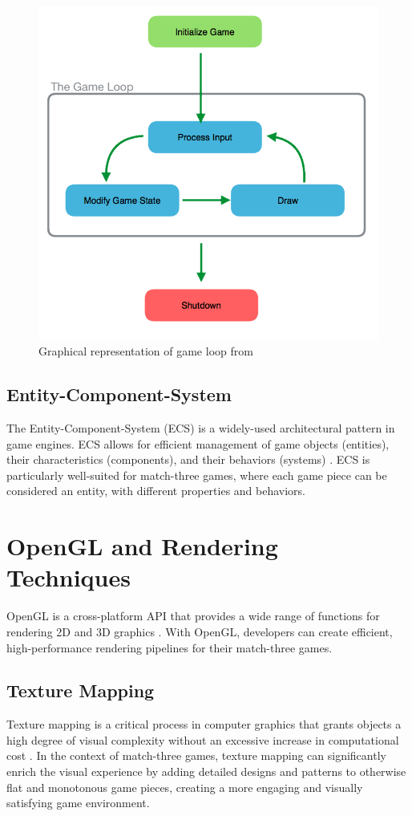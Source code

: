 \documentclass[runningheads, 12pt]{llncs}
\begin{document}
\begin{figure}
\includegraphics[width=\textwidth]{gameloop.png}
\caption{Graphical representation of game loop from \cite{ref_url3}} \label{fig1}
\end{figure}

\subsection{Entity-Component-System}
The Entity-Component-System (ECS) is a widely-used architectural pattern in game engines. ECS allows for efficient management of game objects (entities), their characteristics (components), and their behaviors (systems) \cite{ref_url1}. ECS is particularly well-suited for match-three games, where each game piece can be considered an entity, with different properties and behaviors.

\section{OpenGL and Rendering Techniques}
OpenGL is a cross-platform API that provides a wide range of functions for rendering 2D and 3D graphics \cite{ref_url2}. With OpenGL, developers can create efficient, high-performance rendering pipelines for their match-three games.

\subsection{Texture Mapping}
Texture mapping is a critical process in computer graphics that grants objects a high degree of visual complexity without an excessive increase in computational cost \cite{ref_book2}. In the context of match-three games, texture mapping can significantly enrich the visual experience by adding detailed designs and patterns to otherwise flat and monotonous game pieces, creating a more engaging and visually satisfying game environment.
\end{document}
